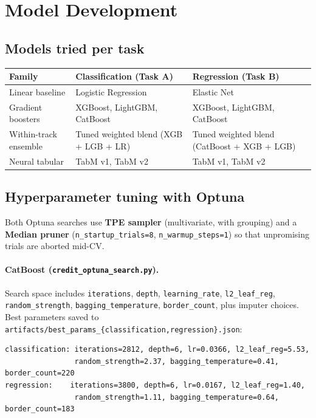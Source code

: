 \documentclass[11pt,a4paper]{article}
\begin{document}
\section{Model Development}

\subsection{Models tried per task}

\begin{table}[h]
\centering
\small
\begin{tabularx}{\linewidth}{lXX}
\toprule
\textbf{Family} & \textbf{Classification (Task A)} & \textbf{Regression (Task B)} \\
\midrule
Linear baseline & Logistic Regression & Elastic Net \\
Gradient boosters & XGBoost, LightGBM, CatBoost & XGBoost, LightGBM, CatBoost \\
Within-track ensemble & Tuned weighted blend (XGB + LGB + LR) & Tuned weighted blend (CatBoost + XGB + LGB) \\
Neural tabular & TabM v1, TabM v2 & TabM v1, TabM v2 \\
\bottomrule
\end{tabularx}
\end{table}

\subsection{Hyperparameter tuning with Optuna}\label{sec:tabm-search}

Both Optuna searches use \textbf{TPE sampler} (multivariate, with grouping) and a \textbf{Median pruner} (\texttt{n\_startup\_trials=8}, \texttt{n\_warmup\_steps=1}) so that unpromising trials are aborted mid-CV.

\paragraph{CatBoost (\texttt{credit\_optuna\_search.py}).} Search space includes \texttt{iterations}, \texttt{depth}, \texttt{learning\_rate}, \texttt{l2\_leaf\_reg}, \texttt{random\_strength}, \texttt{bagging\_temperature}, \texttt{border\_count}, plus imputer choices. Best parameters saved to \texttt{artifacts/best\_params\_\{classification,regression\}.json}:

\begin{lstlisting}
classification: iterations=2812, depth=6, lr=0.0366, l2_leaf_reg=5.53,
                random_strength=2.37, bagging_temperature=0.41, border_count=220
regression:    iterations=3800, depth=6, lr=0.0167, l2_leaf_reg=1.40,
                random_strength=1.11, bagging_temperature=0.64, border_count=183
\end{lstlisting}
\end{document}
